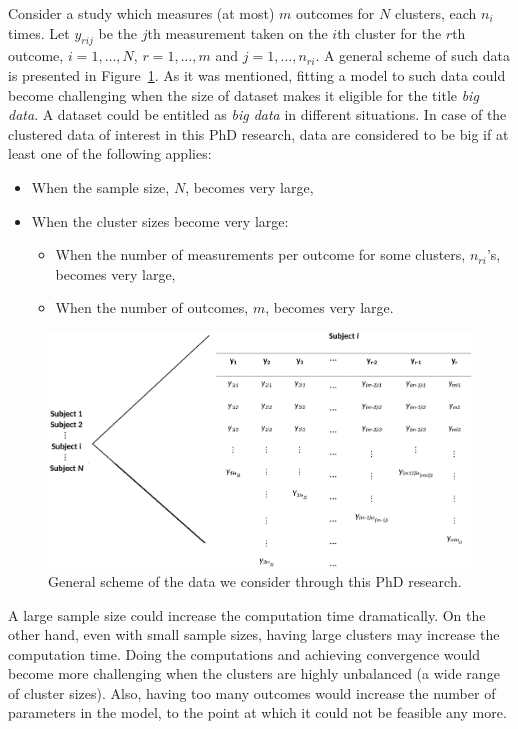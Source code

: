 \documentclass[14pt]{article}
\begin{document}
Consider a study which measures (at most) $m$ outcomes for $N$ clusters, each $n_i$ times. Let $y_{rij}$ be the $j$th measurement taken on the $i$th cluster for the $r$th outcome, $i=1,\ldots,N$, $r=1,\ldots,m$ and $j=1,\ldots,n_{ri}$. A general scheme of such data is presented in Figure~\ref{fig_scheme}. As it was mentioned, fitting a model to such data could become challenging when the size of dataset makes it eligible for the title \emph{big data}. A dataset could be entitled as \emph{big data} in different situations. In case of the clustered data of interest in this PhD research, data are considered to be big if at least one of the following applies:
\begin{itemize}
\item When the sample size, $N$, becomes very large,
\item When the cluster sizes become very large:
\begin{itemize}
\item When the number of measurements per outcome for some clusters, $n_{ri}$'s, becomes very large,
\item When the number of outcomes, $m$, becomes very large.
\end{itemize}
\end{itemize}
\begin{figure}
\centering
\includegraphics[width=\textwidth]{scheme_new.eps}
\caption{General scheme of the data we consider through this PhD research.} 
\label{fig_scheme}
\end{figure} 
A large sample size could increase the computation time dramatically. On the other hand, even with small sample sizes, having large clusters may increase the computation time. Doing the computations and achieving convergence would become more challenging when the clusters are highly unbalanced (a wide range of cluster sizes). Also, having too many outcomes would increase the number of parameters in the model, to the point at which it could not be feasible any more.  
\end{document}
